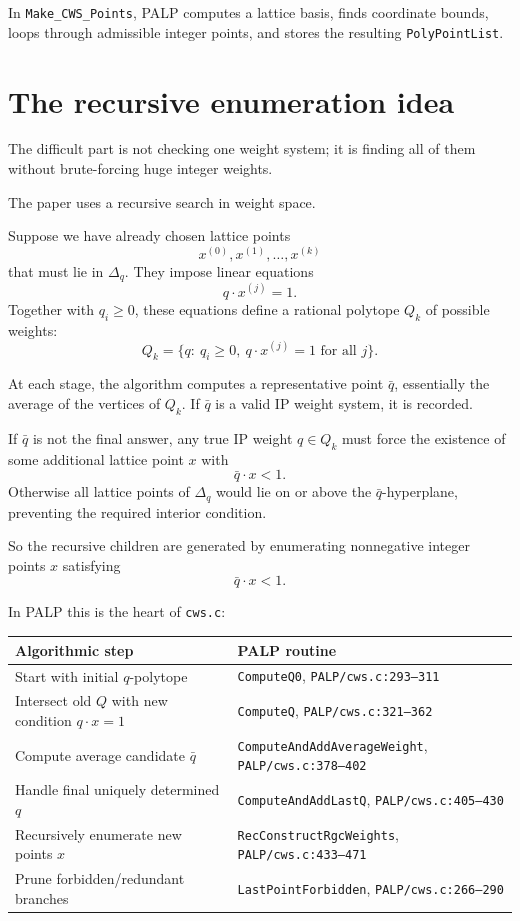 \documentclass[11pt]{article}
\begin{document}
In \texttt{Make\_CWS\_Points}, PALP computes a lattice basis, finds coordinate bounds, loops through admissible integer points, and stores the resulting \texttt{PolyPointList}.

\section{The recursive enumeration idea}

The difficult part is not checking one weight system; it is finding all of them without brute-forcing huge integer weights.

The paper uses a recursive search in weight space.

Suppose we have already chosen lattice points
\[
x^{(0)},x^{(1)},\dots,x^{(k)}
\]
that must lie in \(\Delta_q\). They impose linear equations
\[
q\cdot x^{(j)}=1.
\]
Together with \(q_i\ge0\), these equations define a rational polytope \(Q_k\) of possible weights:
\[
Q_k=\{q:\ q_i\ge0,\ q\cdot x^{(j)}=1\text{ for all }j\}.
\]

At each stage, the algorithm computes a representative point \(\bar q\), essentially the average of the vertices of \(Q_k\). If \(\bar q\) is a valid IP weight system, it is recorded.

If \(\bar q\) is not the final answer, any true IP weight \(q\in Q_k\) must force the existence of some additional lattice point \(x\) with
\[
\bar q\cdot x<1.
\]
Otherwise all lattice points of \(\Delta_q\) would lie on or above the \(\bar q\)-hyperplane, preventing the required interior condition.

So the recursive children are generated by enumerating nonnegative integer points \(x\) satisfying
\[
\bar q\cdot x<1.
\]

In PALP this is the heart of \texttt{cws.c}:

\begin{center}
\begin{tabular}{@{}ll@{}}
\toprule
Algorithmic step & PALP routine \\
\midrule
Start with initial \(q\)-polytope & \texttt{ComputeQ0}, \texttt{PALP/cws.c:293--311} \\
Intersect old \(Q\) with new condition \(q\cdot x=1\) & \texttt{ComputeQ}, \texttt{PALP/cws.c:321--362} \\
Compute average candidate \(\bar q\) & \texttt{ComputeAndAddAverageWeight}, \texttt{PALP/cws.c:378--402} \\
Handle final uniquely determined \(q\) & \texttt{ComputeAndAddLastQ}, \texttt{PALP/cws.c:405--430} \\
Recursively enumerate new points \(x\) & \texttt{RecConstructRgcWeights}, \texttt{PALP/cws.c:433--471} \\
Prune forbidden/redundant branches & \texttt{LastPointForbidden}, \texttt{PALP/cws.c:266--290} \\
\bottomrule
\end{tabular}
\end{center}
\end{document}
